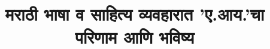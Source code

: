 \documentclass[xcolor=dvipsnames,compress,t,pdf,12pt]{beamer}
\title[\insertframenumber /\inserttotalframenumber]{मराठी भाषा व साहित्य व्यवहारात 'ए.आय.'चा परिणाम आणि भविष्य }
\begin{document}
	\begin{frame}
	\titlepage
	\end{frame}
	
	
\end{document}
